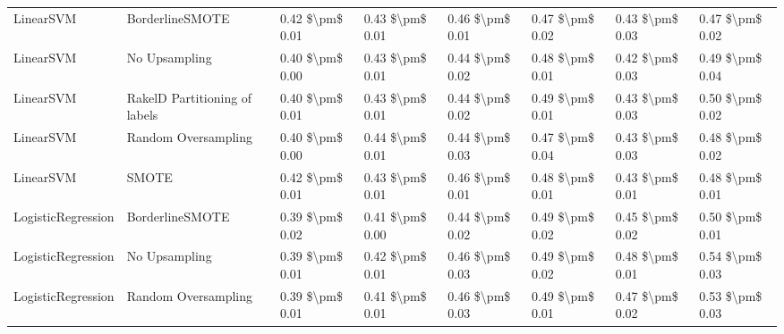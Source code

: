 \begin{tabular}{llllllll}
                      LinearSVM &               BorderlineSMOTE & 0.42 \$\textbackslash pm\$ 0.01 &           0.43 \$\textbackslash pm\$ 0.01 &       0.46 \$\textbackslash pm\$ 0.01 &        0.47 \$\textbackslash pm\$ 0.02 &                         0.43 \$\textbackslash pm\$ 0.03 &     0.47 \$\textbackslash pm\$ 0.02 \\
                      LinearSVM &                 No Upsampling & 0.40 \$\textbackslash pm\$ 0.00 &           0.43 \$\textbackslash pm\$ 0.01 &       0.44 \$\textbackslash pm\$ 0.02 &        0.48 \$\textbackslash pm\$ 0.01 &                         0.42 \$\textbackslash pm\$ 0.03 &     0.49 \$\textbackslash pm\$ 0.04 \\
                      LinearSVM & RakelD Partitioning of labels & 0.40 \$\textbackslash pm\$ 0.01 &           0.43 \$\textbackslash pm\$ 0.01 &       0.44 \$\textbackslash pm\$ 0.02 &        0.49 \$\textbackslash pm\$ 0.01 &                         0.43 \$\textbackslash pm\$ 0.03 &     0.50 \$\textbackslash pm\$ 0.02 \\
                      LinearSVM &           Random Oversampling & 0.40 \$\textbackslash pm\$ 0.00 &           0.44 \$\textbackslash pm\$ 0.01 &       0.44 \$\textbackslash pm\$ 0.03 &        0.47 \$\textbackslash pm\$ 0.04 &                         0.43 \$\textbackslash pm\$ 0.03 &     0.48 \$\textbackslash pm\$ 0.02 \\
                      LinearSVM &                         SMOTE & 0.42 \$\textbackslash pm\$ 0.01 &           0.43 \$\textbackslash pm\$ 0.01 &       0.46 \$\textbackslash pm\$ 0.01 &        0.48 \$\textbackslash pm\$ 0.01 &                         0.43 \$\textbackslash pm\$ 0.01 &     0.48 \$\textbackslash pm\$ 0.01 \\
             LogisticRegression &               BorderlineSMOTE & 0.39 \$\textbackslash pm\$ 0.02 &           0.41 \$\textbackslash pm\$ 0.00 &       0.44 \$\textbackslash pm\$ 0.02 &        0.49 \$\textbackslash pm\$ 0.02 &                         0.45 \$\textbackslash pm\$ 0.02 &     0.50 \$\textbackslash pm\$ 0.01 \\
             LogisticRegression &                 No Upsampling & 0.39 \$\textbackslash pm\$ 0.01 &           0.42 \$\textbackslash pm\$ 0.01 &       0.46 \$\textbackslash pm\$ 0.03 &        0.49 \$\textbackslash pm\$ 0.02 &                         0.48 \$\textbackslash pm\$ 0.01 &     0.54 \$\textbackslash pm\$ 0.03 \\
             LogisticRegression &           Random Oversampling & 0.39 \$\textbackslash pm\$ 0.01 &           0.41 \$\textbackslash pm\$ 0.01 &       0.46 \$\textbackslash pm\$ 0.03 &        0.49 \$\textbackslash pm\$ 0.01 &                         0.47 \$\textbackslash pm\$ 0.02 &     0.53 \$\textbackslash pm\$ 0.03 \\

\end{tabular}
